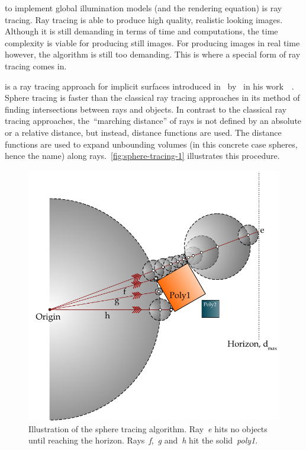 \documentclass[%
    a4paper,    %
    justified,  %
    nobib,      %
    openany     %
]{tufte-book}
\makeatletter
\renewcommand{\label}[1]{\@tufte@label{##1}}%
\makeatother
\begin{document}
 to implement global illumination models (and
the rendering equation) is ray tracing. Ray tracing is able to produce high
quality, realistic looking images. Although it is still demanding in terms of
time and computations, the time complexity is viable for producing still
images. For producing images in real time however, the algorithm is still too
demanding. This is where a special form of ray tracing comes in.

 is a ray tracing approach for implicit surfaces
introduced in~\citeyear{hart_sphere_1994} by~ in
his work~~\cite{hart_sphere_1994}. 
Sphere tracing is faster than the classical ray tracing approaches in its method
of finding
intersections between rays and objects. In contrast to the classical ray tracing
approaches, the~\enquote{marching distance} of rays is not defined by an absolute or a
relative distance, but instead, distance functions are used. The distance functions
are used to expand unbounding volumes (in this concrete case spheres, hence the
name) along rays.~\autoref{fig:sphere-tracing-1} illustrates this procedure.

\begin{figure}[h]
    \centering
    \includegraphics[width=0.75\linewidth]{images/sphere-tracing-principle}
    \caption{Illustration of the sphere tracing
      algorithm.
      Ray~\textit{e} hits no objects until reaching the horizon.
      Rays~\textit{f},~\textit{g} and~\textit{h} hit
      the solid~\textit{poly1}.}
      \label{fig:sphere-tracing-1}
\end{figure}
\end{document}
